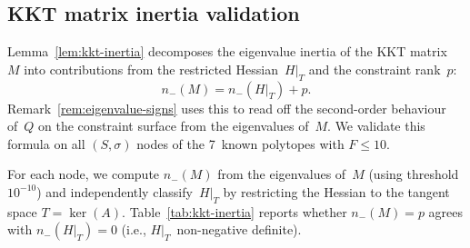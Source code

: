 %
%

\subsection{KKT matrix inertia validation}
\label{sec:kkt-inertia}

Lemma~\ref{lem:kkt-inertia} decomposes the eigenvalue inertia
of the KKT matrix~$M$ into contributions from the restricted
Hessian~$H|_T$ and the constraint rank~$p$:
\begin{equation*}
  n_-(M) = n_-(H|_T) + p.
\end{equation*}
Remark~\ref{rem:eigenvalue-signs} uses this to read off the
second-order behaviour of~$Q$ on the constraint surface from
the eigenvalues of~$M$.
We validate this formula on all $(S,\sigma)$ nodes of the
7~known polytopes with $F \le 10$.

For each node, we compute $n_-(M)$ from the eigenvalues of~$M$
(using threshold $10^{-10}$) and independently classify~$H|_T$
by restricting the Hessian to the tangent space $T = \ker(A)$.
Table~\ref{tab:kkt-inertia} reports whether
$n_-(M) = p$ agrees with $n_-(H|_T) = 0$
(i.e., $H|_T$~non-negative definite).

